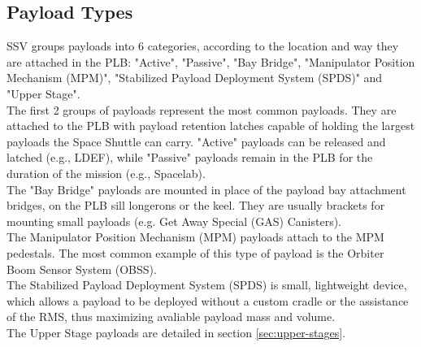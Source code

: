 \documentclass[Space_Shuttle_Vessel_Manual.tex]{subfiles}
\begin{document}
\begin{multicols*}{2}
\subsection{Payload Types}
\noindent
SSV groups payloads into 6 categories, according to the location and way they are attached in the PLB: "Active", "Passive", "Bay Bridge", "Manipulator Position Mechanism (MPM)", "Stabilized Payload Deployment System (SPDS)" and "Upper Stage".
\\
The first 2 groups of payloads represent the most common payloads. They are attached to the PLB with payload retention latches capable of holding the largest payloads the Space Shuttle can carry. "Active" payloads can be released and latched (e.g., LDEF), while "Passive" payloads remain in the PLB for the duration of the mission (e.g., Spacelab).
\\
The "Bay Bridge" payloads are mounted in place of the payload bay attachment bridges, on the PLB sill longerons or the keel. They are usually brackets for mounting small payloads (e.g. Get Away Special (GAS) Canisters).
\\
The Manipulator Position Mechanism (MPM) payloads attach to the MPM pedestals. The most common example of this type of payload is the Orbiter Boom Sensor System (OBSS).
\\
The Stabilized Payload Deployment System (SPDS) is small, lightweight device, which allows a payload to be deployed without a custom cradle or the assistance of the RMS, thus maximizing avaliable payload mass and volume.
\\
The Upper Stage payloads are detailed in section \ref{sec:upper-stages}.



\end{multicols*}
\end{document}
